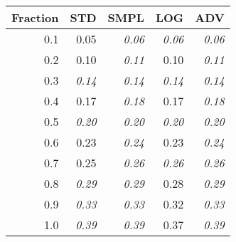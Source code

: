 \documentclass{standalone}
\begin{document}
\begin{tabular}{r|rrrr}
      \toprule
      Fraction & STD & SMPL & LOG & ADV\\
      \midrule
      0.1 & 0.05 & \emph{0.06} & \emph{0.06} & \emph{0.06}\\
  0.2 & 0.10 & \emph{0.11} & 0.10 & \emph{0.11}\\
  0.3 & \emph{0.14} & \emph{0.14} & \emph{0.14} & \emph{0.14}\\
  0.4 & 0.17 & \emph{0.18} & 0.17 & \emph{0.18}\\
  0.5 & \emph{0.20} & \emph{0.20} & \emph{0.20} & \emph{0.20}\\
  0.6 & 0.23 & \emph{0.24} & 0.23 & \emph{0.24}\\
  0.7 & 0.25 & \emph{0.26} & \emph{0.26} & \emph{0.26}\\
  0.8 & \emph{0.29} & \emph{0.29} & 0.28 & \emph{0.29}\\
  0.9 & \emph{0.33} & \emph{0.33} & 0.32 & \emph{0.33}\\
  1.0 & \emph{0.39} & \emph{0.39} & 0.37 & \emph{0.39}\\
  \bottomrule
\end{tabular}
\end{document}
